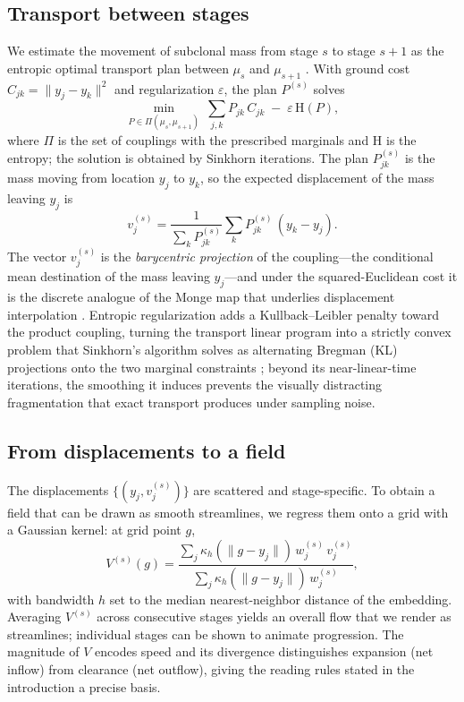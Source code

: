 \documentclass{article}
\begin{document}
\subsection{Transport between stages}

We estimate the movement of subclonal mass from stage $s$ to stage $s{+}1$ as the
entropic optimal transport plan between $\mu_s$ and $\mu_{s+1}$
\citep{Cuturi2013}. With ground cost $C_{jk} = \lVert y_j - y_k \rVert^2$ and
regularization $\varepsilon$, the plan $P^{(s)}$ solves
\begin{equation}
\min_{P \in \Pi(\mu_s, \mu_{s+1})} \ \sum_{j,k} P_{jk}\, C_{jk} \;-\; \varepsilon\, \mathrm{H}(P),
\end{equation}
where $\Pi$ is the set of couplings with the prescribed marginals and $\mathrm{H}$ is
the entropy; the solution is obtained by Sinkhorn iterations. The plan $P^{(s)}_{jk}$
is the mass moving from location $y_j$ to $y_k$, so the expected displacement of the
mass leaving $y_j$ is
\begin{equation}
v^{(s)}_j = \frac{1}{\sum_k P^{(s)}_{jk}} \sum_k P^{(s)}_{jk}\,(y_k - y_j).
\end{equation}
The vector $v^{(s)}_j$ is the \emph{barycentric projection} of the coupling---the
conditional mean destination of the mass leaving $y_j$---and under the
squared-Euclidean cost it is the discrete analogue of the Monge map that underlies
displacement interpolation \citep{McCann1997,Bonneel2011}. Entropic regularization adds
a Kullback--Leibler penalty toward the product coupling, turning the transport linear
program into a strictly convex problem that Sinkhorn's algorithm solves as alternating
Bregman (KL) projections onto the two marginal constraints \citep{Cuturi2013,Benamou2015};
beyond its near-linear-time iterations, the smoothing it induces prevents the visually
distracting fragmentation that exact transport produces under sampling noise.

\subsection{From displacements to a field}

The displacements $\{(y_j, v^{(s)}_j)\}$ are scattered and stage-specific. To obtain a
field that can be drawn as smooth streamlines, we regress them onto a grid with a
Gaussian kernel: at grid point $g$,
\begin{equation}
V^{(s)}(g) = \frac{\sum_j \kappa_h(\lVert g - y_j\rVert)\, w^{(s)}_j\, v^{(s)}_j}
{\sum_j \kappa_h(\lVert g - y_j\rVert)\, w^{(s)}_j},
\end{equation}
with bandwidth $h$ set to the median nearest-neighbor distance of the embedding.
Averaging $V^{(s)}$ across consecutive stages yields an overall flow that we render as
streamlines; individual stages can be shown to animate progression. The magnitude of
$V$ encodes speed and its divergence distinguishes expansion (net inflow) from
clearance (net outflow), giving the reading rules stated in the introduction a precise
basis.
\end{document}
